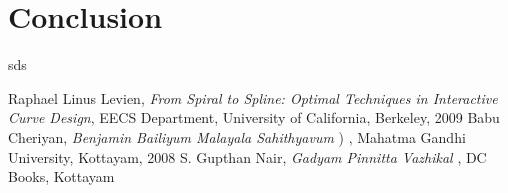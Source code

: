 \documentclass[10pt]{article}
\begin{document}
\section{Conclusion}
sds

\begin{thebibliography}{11}
	 Raphael Linus Levien, \textit{From Spiral to Spline: Optimal Techniques in Interactive Curve Design}, EECS Department, University of California, Berkeley, 2009
	 Babu Cheriyan, \textit{Benjamin Bailiyum Malayala Sahithyavum} {) }, Mahatma Gandhi University, Kottayam, 2008
	 S. Gupthan Nair, \textit{Gadyam Pinnitta Vazhikal}{ }, DC Books, Kottayam 

	
\end{thebibliography}
\end{document}
